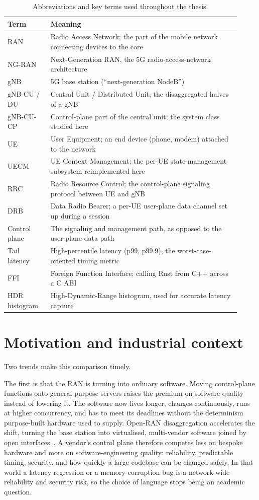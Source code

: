 \documentclass[english,twoside,openright,a4paper,censored,csm,software-track-2020]{HYthesisML}
\begin{document}
\begin{table}
\centering
\caption[Abbreviations and key terms]{Abbreviations and key terms used throughout the thesis.\label{tab:abbrev}}
\renewcommand{\arraystretch}{1.2}
\begin{tabular}{@{}p{0.17\linewidth} p{0.75\linewidth}@{}}
\hline\hline
Term & Meaning \\
\hline
RAN & Radio Access Network; the part of the mobile network connecting devices to the core \\
NG-RAN & Next-Generation RAN, the 5G radio-access-network architecture \\
gNB & 5G base station (``next-generation NodeB'') \\
gNB-CU / DU & Central Unit / Distributed Unit; the disaggregated halves of a gNB \\
gNB-CU-CP & Control-plane part of the central unit; the system class studied here \\
UE & User Equipment; an end device (phone, modem) attached to the network \\
UECM & UE Context Management; the per-UE state-management subsystem reimplemented here \\
RRC & Radio Resource Control; the control-plane signaling protocol between UE and gNB \\
DRB & Data Radio Bearer; a per-UE user-plane data channel set up during a session \\
Control plane & The signaling and management path, as opposed to the user-plane data path \\
Tail latency & High-percentile latency (p99, p99.9), the worst-case-oriented timing metric \\
FFI & Foreign Function Interface; calling Rust from C++ across a C ABI \\
HDR histogram & High-Dynamic-Range histogram, used for accurate latency capture \\
\hline
\end{tabular}
\end{table}

\section{Motivation and industrial context}\label{sec:motivation}
Two trends make this comparison timely.

The first is that the RAN is turning into ordinary software. Moving control-plane functions
onto general-purpose servers raises the premium on software quality instead of lowering it.
The software now lives longer, changes continuously, runs at higher concurrency, and has to
meet its deadlines without the determinism purpose-built hardware used to supply. Open-RAN
disaggregation accelerates the shift, turning the base station into virtualised, multi-vendor
software joined by open interfaces~\cite{polese2023oran}. A vendor's control plane therefore
competes less on bespoke hardware and more on software-engineering quality: reliability,
predictable timing, security, and how quickly a large codebase can be changed safely. In that
world a latency regression or a memory-corruption bug is a network-wide reliability and
security risk, so the choice of language stops being an academic question.
\end{document}
